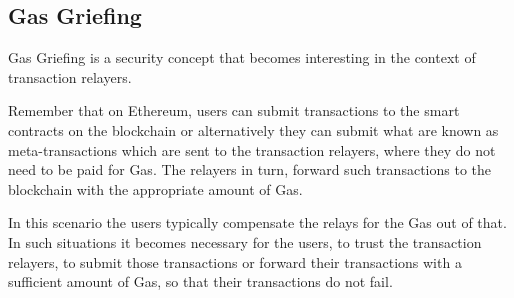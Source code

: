 \subsection{Gas Griefing}\label{gas-griefing}

Gas Griefing is a security concept that becomes interesting in the
context of transaction relayers.

Remember that on Ethereum, users can submit transactions to the smart
contracts on the blockchain or alternatively they can submit what are
known as meta-transactions which are sent to the transaction relayers,
where they do not need to be paid for Gas. The relayers in turn, forward
such transactions to the blockchain with the appropriate amount of Gas.

In this scenario the users typically compensate the relays for the Gas
out of that. In such situations it becomes necessary for the users, to
trust the transaction relayers, to submit those transactions or forward
their transactions with a sufficient amount of Gas, so that their
transactions do not fail.
